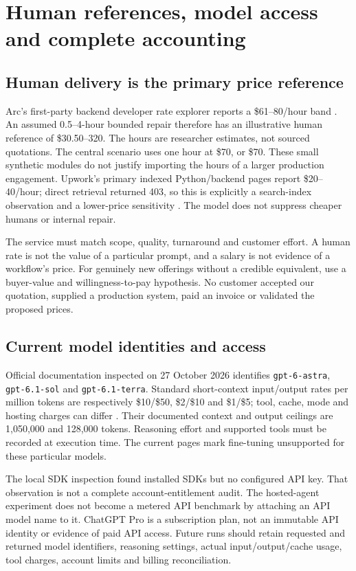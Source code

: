 \documentclass[11pt,letterpaper]{article}
\begin{document}
\section{Human references, model access and complete accounting}
\subsection{Human delivery is the primary price reference}
Arc's first-party backend developer rate explorer reports a \$61--80/hour band \cite{arc}. An assumed 0.5--4-hour bounded repair therefore has an illustrative human reference of \$30.50--320. The hours are researcher estimates, not sourced quotations. The central scenario uses one hour at \$70, or \$70. These small synthetic modules do not justify importing the hours of a larger production engagement. Upwork's primary indexed Python/backend pages report \$20--40/hour; direct retrieval returned 403, so this is explicitly a search-index observation and a lower-price sensitivity \cite{upwork}. The model does not suppress cheaper humans or internal repair.

The service must match scope, quality, turnaround and customer effort. A human rate is not the value of a particular prompt, and a salary is not evidence of a workflow's price. For genuinely new offerings without a credible equivalent, use a buyer-value and willingness-to-pay hypothesis. No customer accepted our quotation, supplied a production system, paid an invoice or validated the proposed prices.

\subsection{Current model identities and access}
Official documentation inspected on 27 October 2026 identifies \texttt{gpt-6-astra}, \texttt{gpt-6.1-sol} and \texttt{gpt-6.1-terra}. Standard short-context input/output rates per million tokens are respectively \$10/\$50, \$2/\$10 and \$1/\$5; tool, cache, mode and hosting charges can differ \cite{astra,sol,terra,pricing}. Their documented context and output ceilings are 1,050,000 and 128,000 tokens. Reasoning effort and supported tools must be recorded at execution time. The current pages mark fine-tuning unsupported for these particular models.

The local SDK inspection found installed SDKs but no configured API key. That observation is not a complete account-entitlement audit. The hosted-agent experiment does not become a metered API benchmark by attaching an API model name to it. ChatGPT Pro is a subscription plan, not an immutable API identity or evidence of paid API access. Future runs should retain requested and returned model identifiers, reasoning settings, actual input/output/cache usage, tool charges, account limits and billing reconciliation.
\end{document}

